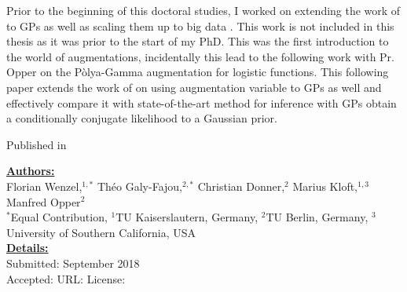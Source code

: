 


\graphicspath{{3/figures/}}

Prior to the beginning of this doctoral studies, I worked on extending the work of \citet{henaoBayesianNonlinearSupport2014} to \ac{GPs} as well as scaling them up to big data \cite{wenzel2017bayesian}.
This work is not included in this thesis as it was prior to the start of my PhD.
This was the first introduction to the world of augmentations, incidentally this lead to the following work with Pr. Opper on the P\`olya-Gamma augmentation for logistic functions.
This following paper extends the work of \citet{polsonBayesianInferenceLogistic2012} on using augmentation variable to \ac{GPs} as well and effectively compare it with state-of-the-art method for inference with \ac{GPs} obtain a conditionally conjugate likelihood to a Gaussian prior.

Published in 

\textbf{\underline{Authors:}}\\
Florian Wenzel,$^{1,*}$ Th\'eo Galy-Fajou,$^{2,*}$ Christian Donner,$^{2}$ Marius Kloft,$^{1,3}$ Manfred Opper$^2$\\
$^*$Equal Contribution, $^1$TU Kaiserslautern, Germany, $^2$TU Berlin, Germany, $^3$University of Southern California, USA\\

\textbf{\underline{Details:}}\\
Submitted: September 2018\\
Accepted: 
URL:
License:

